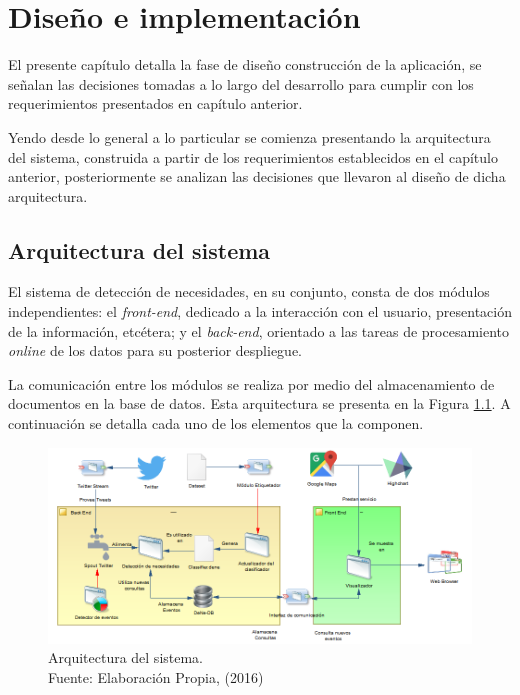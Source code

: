 \chapter{Diseño e implementación}
\label{cap:Diseno}

El presente capítulo detalla la fase de diseño construcción de la aplicación, se señalan las decisiones tomadas a lo largo del desarrollo para cumplir con los requerimientos presentados en capítulo anterior.

Yendo desde lo general a lo particular se comienza presentando la arquitectura del sistema, construida a partir de los requerimientos establecidos en el capítulo anterior, posteriormente se analizan las decisiones que llevaron al diseño de dicha arquitectura.

\section{Arquitectura del sistema}
\label{sec:Arquitectura}

El sistema de detección de necesidades, en su conjunto, consta de dos módulos independientes: el \textit{front-end}, dedicado a la interacción con el usuario, presentación de la información, etcétera; y el \textit{back-end}, orientado a las tareas de procesamiento \textit{online} de los datos para su posterior despliegue.

La comunicación entre los módulos se realiza por medio del almacenamiento de documentos en la base de datos. Esta arquitectura se presenta en la Figura \ref{fig:arquitecturaSistema}. A continuación se detalla cada uno de los elementos que la componen.

\begin{figure}[H]
	\centering
	\captionsetup{justification=centering}
	\includegraphics[scale=0.6]{images/arquitectura.png}
	\caption[Arquitectura del sistema.]{Arquitectura del sistema.\\Fuente: Elaboración Propia, (2016)}
	\label{fig:arquitecturaSistema}
\end{figure}

